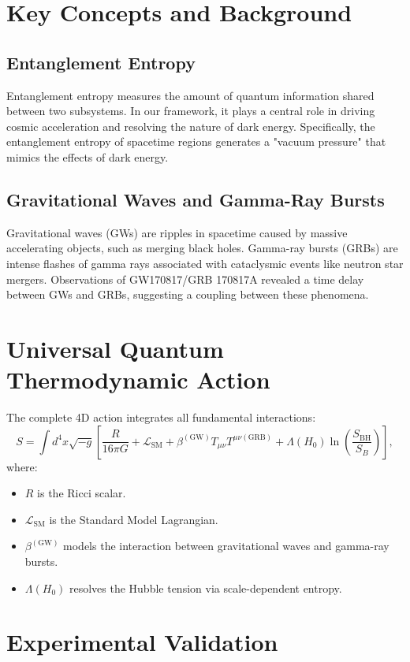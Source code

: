 \documentclass[12pt,a4paper]{article}
\begin{document}
\section{Key Concepts and Background}

\subsection{Entanglement Entropy}
Entanglement entropy measures the amount of quantum information shared between two subsystems. In our framework, it plays a central role in driving cosmic acceleration and resolving the nature of dark energy. Specifically, the entanglement entropy of spacetime regions generates a "vacuum pressure" that mimics the effects of dark energy.

\subsection{Gravitational Waves and Gamma-Ray Bursts}
Gravitational waves (GWs) are ripples in spacetime caused by massive accelerating objects, such as merging black holes. Gamma-ray bursts (GRBs) are intense flashes of gamma rays associated with cataclysmic events like neutron star mergers. Observations of GW170817/GRB 170817A revealed a time delay between GWs and GRBs, suggesting a coupling between these phenomena.

\section{Universal Quantum Thermodynamic Action}

The complete 4D action integrates all fundamental interactions:
\[
S = \int d^4x \sqrt{-g} \left[ \frac{R}{16\pi G} + \mathcal{L}_{\text{SM}} + \beta^{(\text{GW})} T_{\mu\nu} T^{\mu\nu (\text{GRB})} + \Lambda(H_0) \ln\left(\frac{S_{\text{BH}}}{S_B}\right) \right],
\]
where:
\begin{itemize}
    \item $R$ is the Ricci scalar.
    \item $\mathcal{L}_{\text{SM}}$ is the Standard Model Lagrangian.
    \item $\beta^{(\text{GW})}$ models the interaction between gravitational waves and gamma-ray bursts.
    \item $\Lambda(H_0)$ resolves the Hubble tension via scale-dependent entropy.
\end{itemize}

\section{Experimental Validation}
\end{document}
